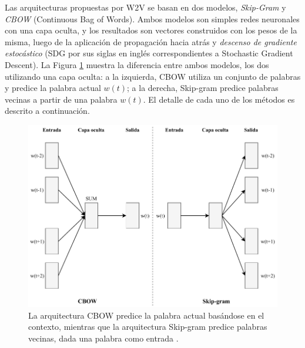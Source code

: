 Las arquitecturas propuestas por W2V se basan en dos modelos, \textit{Skip-Gram} y \textit{CBOW} (Continuous Bag of Words). Ambos modelos son simples redes neuronales con una capa oculta, y los resultados son vectores construidos con los pesos de la misma, luego de la aplicación de propagación hacia atrás y \textit{descenso de gradiente estocástico} (SDG por sus siglas en inglés correspondientes a Stochastic Gradient Descent). La Figura \ref{fig:cbowskipgram} muestra la diferencia entre ambos modelos, los dos utilizando una capa oculta: a la izquierda, CBOW utiliza un conjunto de palabras y predice la palabra actual \(w(t)\); a la derecha, Skip-gram predice palabras vecinas a partir de una palabra \(w(t)\). El detalle de cada uno de los métodos es descrito a continuación.

\begin{figure}[h!]
	\centering
	\includegraphics[width=0.7\linewidth]{7_marco_teorico/imagenes/cbow_skipgram.pdf}
	\caption{La arquitectura CBOW predice la palabra actual basándose en el contexto, mientras que la arquitectura Skip-gram predice palabras vecinas, dada una palabra como entrada \citep{mikolov2013efficient}.}
	\label{fig:cbowskipgram}
\end{figure}


